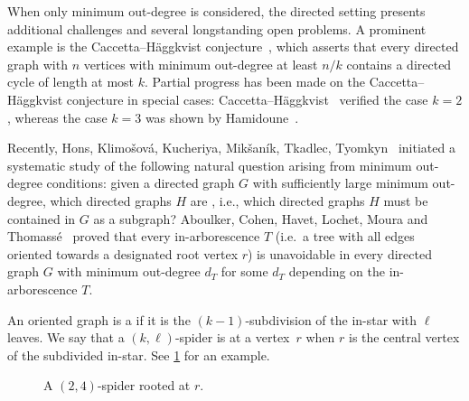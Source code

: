 \documentclass[a4paper,USenglish,cleveref,autoref,thm-restate,pdfa]{lipics-v2021}
\let\emph\relax\DeclareTextFontCommand{\emph}{\color{dark blue}\em}
\begin{document}
When only minimum out-degree is considered, the directed setting presents additional challenges and several longstanding open problems. A prominent example is the Caccetta--H{\"a}ggkvist conjecture~\cite{caccetta1978minimal}, which asserts that every directed graph with $n$ vertices with minimum out-degree at least $n/k$ contains a directed cycle of length at most $k$.
Partial progress has been made on the Caccetta--H{\"a}ggkvist conjecture in special cases: Caccetta--H{\"a}ggkvist~\cite{caccetta1978minimal} verified the case $k=2$, whereas the case $k=3$ was shown by Hamidoune~\cite{Hamidoune1987}. 


Recently, Hons, Klimošová, Kucheriya, Mikšaník, Tkadlec, Tyomkyn~\cite{hons2025unavoidable} initiated a systematic study of the following natural question arising from minimum out-degree conditions: given a directed graph $G$ with sufficiently large minimum out-degree, which directed graphs $H$ are \emph{unavoidable}, i.e., which directed graphs $H$ must be contained in $G$ as a subgraph?
Aboulker, Cohen, Havet, Lochet, Moura and Thomassé~\cite{aboulker1610subdivisions} proved that every in-arborescence $T$
    (i.e.\ a tree with all edges oriented towards a designated root vertex $r$)
    is unavoidable in every directed graph $G$ with minimum out-degree $d_T$ for some $d_T$ depending on the in-arborescence $T$.

An oriented graph is a \emph{$(k,\ell)$\nobreakdash-spider} if it is the $(k-1)$-subdivision of the in-star with $\ell$ leaves.
We say that a $(k,\ell)$\nobreakdash-spider is \emph{rooted} at a vertex~$r$ when $r$ is the central vertex of the subdivided in-star.
See \cref{fig:spider} for an example. 

\begin{figure}[ht]
    \centering
{}

    \caption{A $(2,4)$\nobreakdash-spider rooted at $r$.}
    \label{fig:spider}
\end{figure}
\end{document}
